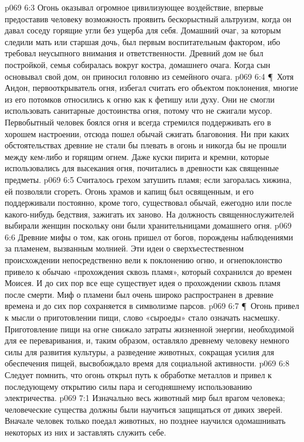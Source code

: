 \vs p069 6:3 Огонь оказывал огромное цивилизующее воздействие, впервые предоставив человеку возможность проявить бескорыстный альтруизм, когда он давал соседу горящие угли без ущерба для себя. Домашний очаг, за которым следили мать или старшая дочь, был первым воспитательным фактором, ибо требовал неусыпного внимания и ответственности. Древний дом не был постройкой, семья собиралась вокруг костра, домашнего очага. Когда сын основывал свой дом, он приносил головню из семейного очага.
\vs p069 6:4 \P\ Хотя Андон, первооткрыватель огня, избегал считать его объектом поклонения, многие из его потомков относились к огню как к фетишу или духу. Они не смогли использовать санитарные достоинства огня, потому что не сжигали мусор. Первобытный человек боялся огня и всегда стремился поддерживать его в хорошем настроении, отсюда пошел обычай сжигать благовония. Ни при каких обстоятельствах древние не стали бы плевать в огонь и никогда бы не прошли между кем\hyp{}либо и горящим огнем. Даже куски пирита и кремни, которые использовались для высекания огня, почитались в древности как священные предметы.
\vs p069 6:5 Считалось грехом затушить пламя; если загоралась хижина, ей позволяли сгореть. Огонь храмов и капищ был освященным, и его поддерживали постоянно, кроме того, существовал обычай, ежегодно или после какого\hyp{}нибудь бедствия, зажигать их заново. На должность священнослужителей выбирали женщин поскольку они были хранительницами домашнего огня.
\vs p069 6:6 Древние мифы о том, как огонь пришел от богов, порождены наблюдениями за пламенем, вызванным молнией. Эти идеи о сверхъестественном происхождении непосредственно вели к поклонению огню, и огнепоклонство привело к обычаю «прохождения сквозь пламя», который сохранился до времен Моисея. И до сих пор все еще существует идея о прохождении сквозь пламя после смерти. Миф о пламени был очень широко распространен в древние времена и до сих пор сохраняется в символизме парсов.
\vs p069 6:7 \P\ Огонь привел к мысли о приготовлении пищи, слово «сыроеды» стало означать насмешку. Приготовление пищи на огне снижало затраты жизненной энергии, необходимой для ее переваривания, и, таким образом, оставляло древнему человеку немного силы для развития культуры, а разведение животных, сокращая усилия для обеспечения пищей, высвобождало время для социальной активности.
\vs p069 6:8 Следует помнить, что огонь открыл путь к обработке металлов и привел к последующему открытию силы пара и сегодняшнему использованию электричества.
\vs p069 7:1 Изначально весь животный мир был врагом человека; человеческие существа должны были научиться защищаться от диких зверей. Вначале человек только поедал животных, но позднее научился одомашнивать некоторых из них и заставлять служить себе.
